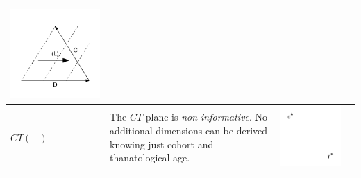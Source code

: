 \documentclass[
  12pt
]{scrartcl}
\begin{document}
\begin{center}
\begin{longtable}{m{}m{}m{}m{}}
  \includegraphics[width = \linewidth]{../fig/CDl_iso.pdf}  \\
  \midrule
  $CT(-)$ &
  The $CT$ plane is \emph{non-informative}. No additional dimensions can be derived knowing just cohort and thanatological age. &
  \includegraphics[width = \linewidth]{../fig/CT.pdf} &

\end{longtable}
\end{center}
\end{document}
